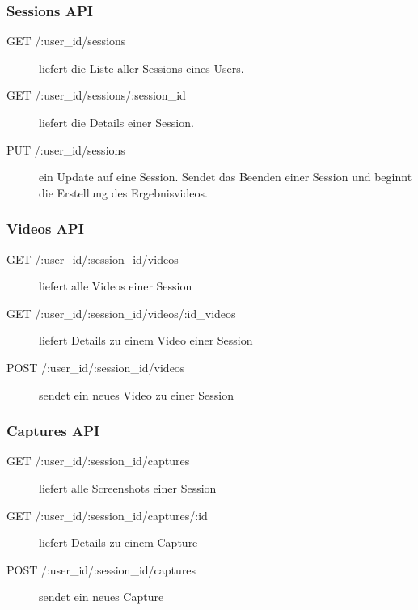 \subsubsection{Sessions API}

\begin{description}
	\item[GET /:user\_id/sessions] liefert die Liste aller Sessions eines Users.
	
	\item[GET /:user\_id/sessions/:session\_id] liefert die Details einer Session. 
	
	\item[PUT /:user\_id/sessions] ein Update auf eine Session. Sendet das Beenden einer Session und beginnt die Erstellung des Ergebnisvideos.
\end{description}


\subsubsection{Videos API}

\begin{description}
	\item[GET /:user\_id/:session\_id/videos] liefert alle Videos einer Session
	
	\item[GET /:user\_id/:session\_id/videos/:id\_videos] liefert Details zu einem Video einer Session
	
	\item[POST /:user\_id/:session\_id/videos] sendet ein neues Video zu einer Session
\end{description}


\subsubsection{Captures API}

\begin{description}
	\item[GET /:user\_id/:session\_id/captures] liefert alle Screenshots einer Session
	
	\item[GET /:user\_id/:session\_id/captures/:id] liefert Details zu einem Capture
	
	\item[POST /:user\_id/:session\_id/captures] sendet ein neues Capture

\end{description}

